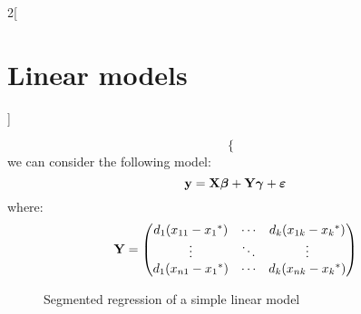 \documentclass[../../../main_math.tex]{subfiles}
\begin{document}
\begin{multicols}{2}[\section{Linear models}]
\begin{definition}
\begin{equation}
\begin{cases}
      \end{cases}
    \end{equation}
    we can consider the following model:
    $$\boldsymbol{\mathrm{y}}=\boldsymbol{\mathrm{X}}\boldsymbol{\mathrm{\beta}}+\boldsymbol{\mathrm{Y}}\boldsymbol{\mathrm{\gamma}}+\boldsymbol{\mathrm{\varepsilon}}$$
    where: $$\boldsymbol{\mathrm{Y}}=\begin{pmatrix}
        d_1(x_{11}-{x_1}^*) & \cdots & d_k(x_{1k}-{x_k}^*) \\
        \vdots              & \ddots & \vdots              \\
        d_1(x_{n1}-{x_1}^*) & \cdots & d_k(x_{nk}-{x_k}^*) \\
      \end{pmatrix}$$
  \end{definition}
  \begin{figure}[H]
    \centering
    
    \caption{Segmented regression of a simple linear model}
  \end{figure}

\end{multicols}
\end{document}
